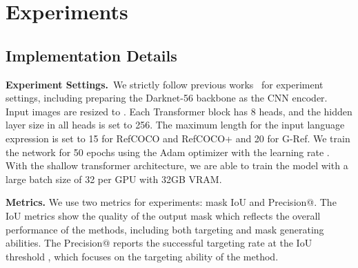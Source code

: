 \documentclass[10pt,twocolumn,letterpaper]{article}
\begin{document}
\section{Experiments}

\subsection{Implementation Details}

\textbf{Experiment Settings.}~We strictly follow previous works~\cite{luo2020multi,yu2018mattnet} for experiment settings, including preparing the Darknet-56 backbone as the CNN encoder. Input images are resized to . Each Transformer block has 8 heads, and the hidden layer size in all heads is set to 256. The maximum length for the input language expression is set to 15 for RefCOCO and RefCOCO+ and 20 for G-Ref. We train the network for 50 epochs using the Adam optimizer with the learning rate . With the shallow transformer architecture, we are able to train the model with a large batch size of 32 per GPU with 32GB VRAM.

\textbf{Metrics.} We use two metrics for experiments: mask IoU and Precision@. The IoU metrics show the quality of the output mask which reflects the overall performance of the methods, including both targeting and mask generating abilities. The Precision@ reports the successful targeting rate at the IoU threshold , which focuses on the targeting ability of the method.


\begin{table*}[t!]
   \centering
   \small
   \caption{Influence of Query Numbers. : without Query Balance Module}
   \label{tab:exp_nq}\end{table*}
\end{document}
